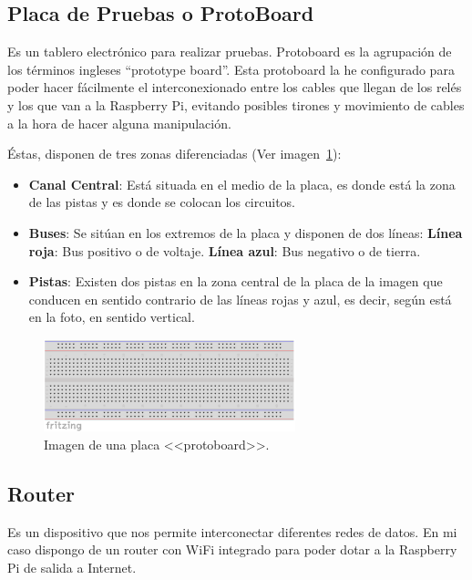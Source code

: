 \subsection{Placa de Pruebas o ProtoBoard}\label{4:protoboard}
Es un tablero electrónico para realizar pruebas. Protoboard es la agrupación de los términos ingleses “prototype board”.
Esta protoboard la he configurado para poder hacer fácilmente el interconexionado entre los cables que llegan de los relés y los que van a la Raspberry Pi, evitando posibles tirones y movimiento de cables a la hora de hacer alguna manipulación.

Éstas, disponen de tres zonas diferenciadas (Ver imagen~\ref{Img:Protoboard}):

\begin{itemize}
    \item \textbf{Canal Central}: Está situada en el medio de la placa, es donde está la zona de las pistas y es donde se colocan los circuitos.
    \item \textbf{Buses}: Se sitúan en los extremos de la placa y disponen de dos líneas:
        \subitem \textbf{Línea roja}: Bus positivo o de voltaje.
        \subitem \textbf{Línea azul}: Bus negativo o de tierra.
    \item \textbf{Pistas}: Existen dos pistas en la zona central de la placa de la imagen que conducen en sentido contrario de las líneas rojas y azul, es decir, según está en la foto, en sentido vertical.
\end{itemize}

\begin{figure}
    \centering
    \includegraphics[width=0.65\textwidth]{img/protoboard.pdf}
    \caption{Imagen de una placa <<protoboard>>. } \label{Img:Protoboard}
\end{figure}

\subsection{Router}\label{4:Router}
Es un dispositivo que nos permite interconectar diferentes redes de datos. En mi caso dispongo de un router con WiFi integrado para poder dotar a la Raspberry Pi de salida a Internet.

